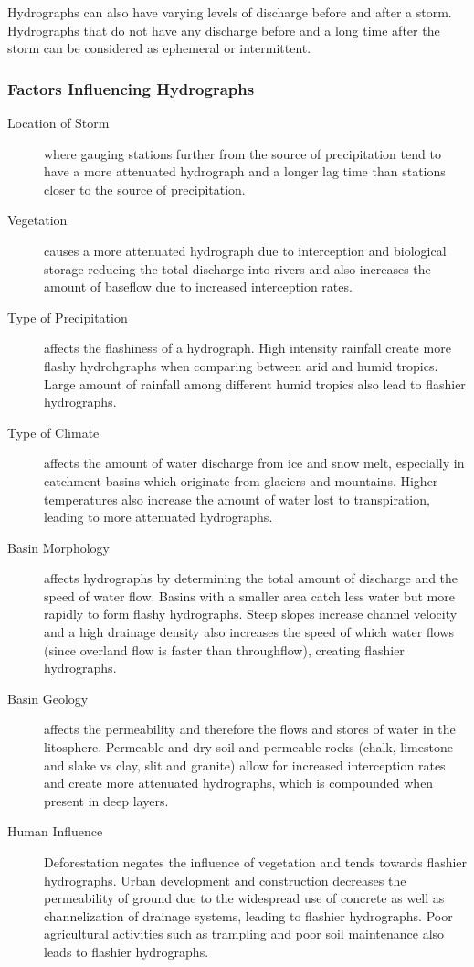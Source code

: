 \documentclass[../../main]{subfiles}
\begin{document}
	Hydrographs can also have varying levels of discharge before and after a storm. Hydrographs that do not have any discharge before and a long time after the storm can be considered as ephemeral or intermittent.

\subsubsection{Factors Influencing Hydrographs}

	\begin{description}
		\item[Location of Storm] where gauging stations further from the source of precipitation tend to have a more attenuated hydrograph and a longer lag time than stations closer to the source of precipitation.
		\item[Vegetation] causes a more attenuated hydrograph due to interception and biological storage reducing the total discharge into rivers and also increases the amount of baseflow due to increased interception rates.
		\item[Type of Precipitation] affects the flashiness of a hydrograph. High intensity rainfall create more flashy hydrohgraphs when comparing between arid and humid tropics. Large amount of rainfall among different humid tropics also lead to flashier hydrographs.
		\item[Type of Climate] affects the amount of water discharge from ice and snow melt, especially in catchment basins which originate from glaciers and mountains. Higher temperatures also increase the amount of water lost to transpiration, leading to more attenuated hydrographs.
		\item[Basin Morphology] affects hydrographs by determining the total amount of discharge and the speed of water flow. Basins with a smaller area catch less water but more rapidly to form flashy hydrographs. Steep slopes increase channel velocity and a high drainage density also increases the speed of which water flows (since overland flow is faster than throughflow), creating flashier hydrographs.
		\item[Basin Geology] affects the permeability and therefore the flows and stores of water in the litosphere. Permeable and dry soil and permeable rocks (chalk, limestone and slake vs clay, slit and granite) allow for increased interception rates and create more attenuated hydrographs, which is compounded when present in deep layers.
		\item[Human Influence] Deforestation negates the influence of vegetation and tends towards flashier hydrographs. Urban development and construction decreases the permeability of ground due to the widespread use of concrete as well as channelization of drainage systems, leading to flashier hydrographs. Poor agricultural activities such as trampling and poor soil maintenance also leads to flashier hydrographs.
	\end{description}
\end{document}
